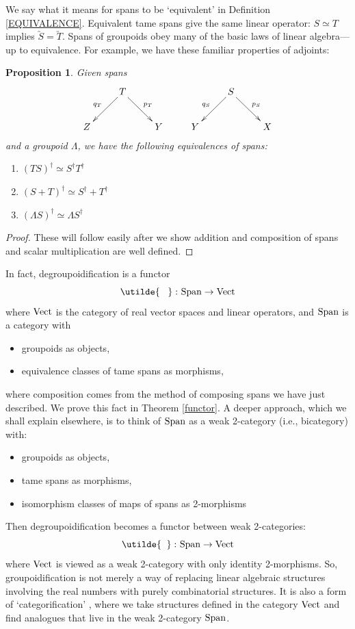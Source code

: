 \documentclass{article}
\newcommand{\Vect}{{\rm Vect}}
\newcommand{\Span}{{\rm Span}}
\renewcommand{\to}{\rightarrow}
\newcommand{\maps}{\colon}
\newtheorem*{proposition*}{Proposition}
\begin{document}
We say what it means for spans to be `equivalent' in Definition
\ref{EQUIVALENCE}.  Equivalent tame spans give the same linear
operator: $S \simeq T$ implies $\utilde{S} = \utilde{T}$.  Spans of
groupoids obey many of the basic laws of linear algebra---up to
equivalence.  For example, we have these familiar properties of
adjoints:

\begin{proposition*}
Given spans
\[
\xymatrix{
& T \ar[dl]_{q_T} \ar[dr]^{p_T} & & & S \ar[dl]_{q_S} \ar[dr]^{p_S} & \\
Z & & Y & Y & & X
}
\]
and a groupoid $\Lambda$, we have the following equivalences of 
spans:
\begin{enumerate}
\item $(TS)^\dagger \simeq S^\dagger T^\dagger$
\item $(S+T)^\dagger \simeq S^\dagger + T^\dagger$
\item $(\Lambda S)^\dagger \simeq \Lambda S^\dagger$
\end{enumerate}
\end{proposition*}

\begin{proof}
These will follow easily after we show addition and composition 
of spans and scalar multiplication are well defined.
\end{proof}

\noindent
In fact, degroupoidification is a functor 
\[         \utilde{\;\;\;} \,\maps \Span \to \Vect   \]
where $\Vect$ is the category of real vector spaces and linear
operators, and $\Span$ is a category with 
\begin{itemize}
\item
groupoids as objects,
\item
equivalence classes of tame spans as morphisms,
\end{itemize}
where composition comes from the method of composing spans we have
just described.  We prove this fact in Theorem \ref{functor}.  A
deeper approach, which we shall explain elsewhere, is to think of
$\Span$ as a weak 2-category (i.e., bicategory) with:
\begin{itemize}
\item
groupoids as objects,
\item
tame spans as morphisms,
\item
isomorphism classes of maps of spans as 2-morphisms
\end{itemize}
Then degroupoidification becomes a functor between weak 2-categories:
\[         \utilde{\;\;} \, \maps \Span \to \Vect   \]
where $\Vect$ is viewed as a weak 2-category with only identity
2-morphisms.  So, groupoidification is not merely a way of replacing
linear algebraic structures involving the real numbers with purely
combinatorial structures.  It is also a form of `categorification'
\cite{BaezDolan:1998}, where we take structures defined in the
category $\Vect$ and find analogues that live in the weak 2-category
$\Span$.
\end{document}
